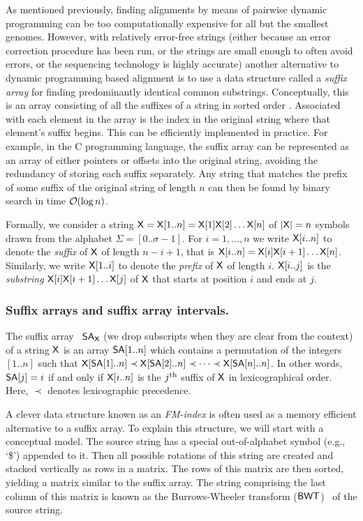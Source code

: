 As mentioned previously, finding alignments by means of pairwise dynamic programming can be too computationally expensive for all but the smallest genomes.  However, with relatively error-free strings (either because an error correction procedure has been run, or the strings are small enough to often avoid errors, or the sequencing technology is highly accurate) another alternative to dynamic programming based alignment is to use a data structure called a \emph{suffix array} for finding predominantly identical common substrings.
Conceptually, this is an array consisting of all the suffixes of a string in sorted order \cite{manber1993suffix}.
Associated with each element in the array is the index in the original string where that element's suffix begins.
This can be efficiently implemented in practice. For example, in the C programming language, the suffix array can be represented as an array of either pointers or offsets into the original string, avoiding the redundancy of storing each suffix separately. 
Any string that matches the prefix of some suffix of the original string of length $n$ can then be found by binary search in time $\bigO(\log n)$.

Formally,  we consider a string $\mathsf{X} = \mathsf{X}[1..n] = \mathsf{X}[1]\mathsf{X}[2]\ldots
\mathsf{X}[n]$ of $|\mathsf{X}| = n$ symbols drawn from the alphabet $\Sigma =[0..\sigma-1]$.
For $i=1,\ldots,n$ we
write $\mathsf{X}[i..n]$ to denote the \emph{suffix} of $\mathsf{X}$ of length $n-i+1$,
that is $\mathsf{X}[i..n] = \mathsf{X}[i]\mathsf{X}[i+1]\ldots \mathsf{X}[n]$.
Similarly, we write
$\mathsf{X}[1..i]$ to denote the \emph{prefix} of $\mathsf{X}$ of length $i$.
$\mathsf{X}[i..j]$ is the \emph{substring} $\mathsf{X}[i]\mathsf{X}[i+1]\ldots \mathsf{X}[j]$ of $\mathsf{X}$
that starts at position $i$ and ends at $j$.

\subsubsection{Suffix arrays and suffix array intervals.}
\label{backward-search}
The suffix array~\cite{mm1993} $\mbox{\rm {\sf SA}}_{\mathsf{X}}$ (we drop subscripts when
they are clear
from the context) of a string $\mathsf{X}$
is an array $\mbox{\rm {\sf SA}}[1..n]$ which
contains a permutation of the integers $[1..n]$ such that $\mathsf{X}[\mbox{\rm {\sf SA}}[1]..n]
\prec \mathsf{X}[\mbox{\rm {\sf SA}}[2]..n] \prec \cdots \prec \mathsf{X}[\mbox{\rm {\sf SA}}[n]..n]$.  In other words, $\mbox{\rm {\sf SA}}[j] =
i$ if and only if $\mathsf{X}[i..n]$ is the $j^{\mbox{{\scriptsize th}}}$ suffix of $\mathsf{X}$
in lexicographical order. Here, $\prec$ denotes lexicographic precedence.





A clever data structure known as an \emph{FM-index} is often used as a memory efficient alternative to a suffix array.
To explain this structure, we will start with a conceptual model.
The source string has a special out-of-alphabet symbol (e.g., `\$') appended to it.
Then all possible rotations of this string are created and stacked vertically as rows in a matrix.
The rows of this matrix are then sorted, yielding a matrix similar to the suffix array.
The string comprising the last column of this matrix is  known as the Burrows-Wheeler transform ($\mbox{\rm {\sf BWT}}$)~\cite{burrows1994block} of the source string.

